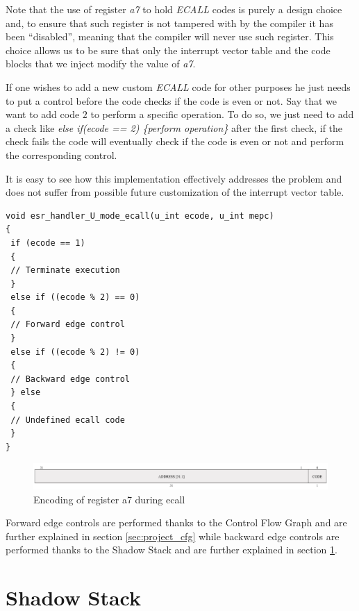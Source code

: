 Note that the use of register \textit{a7} to hold \textit{ECALL} codes is purely
a design choice and, to ensure that such register is not tampered with by the
compiler it has been ``disabled'', meaning that the compiler will never use such
register. This choice allows us to be sure that only the interrupt vector table
and the code blocks that we inject modify the value of \textit{a7}.

If one wishes to add a new custom \textit{ECALL} code for other purposes he just
needs to put a control before the code checks if the code is even or not. Say that
we want to add code $2$ to perform a specific operation. To do so, we just need to
add a check like \textit{else if(ecode == 2) \{perform operation\}} after the
first check, if the check fails the code will eventually check if the code is even
or not and perform the corresponding control.

It is easy to see how this implementation effectively addresses the problem and does
not suffer from possible future customization of the interrupt vector table.

\begin{lstlisting}[style=CStyle, caption = U-mode \textit{ECALL} handler, label={lst:ecallhandler}]
void esr_handler_U_mode_ecall(u_int ecode, u_int mepc)
{
 if (ecode == 1)
 {
 // Terminate execution
 }
 else if ((ecode % 2) == 0)
 {
 // Forward edge control
 }
 else if ((ecode % 2) != 0)
 {
 // Backward edge control
 } else
 {
 // Undefined ecall code
 }
}
\end{lstlisting}

\begin{figure}[htbp]
  \centering
  \includegraphics[width=.9\linewidth]{images/ecall_code.png}
  \caption{Encoding of register a7 during ecall}
  \label{fig:ecall}
\end{figure}

Forward edge controls are performed thanks to the Control Flow Graph and are further
explained in section \ref{sec:project_cfg} while backward edge controls are performed
thanks to the Shadow Stack and are further explained in section \ref{sec:project_ss}.

\section{Shadow Stack}
\label{sec:project_ss}

